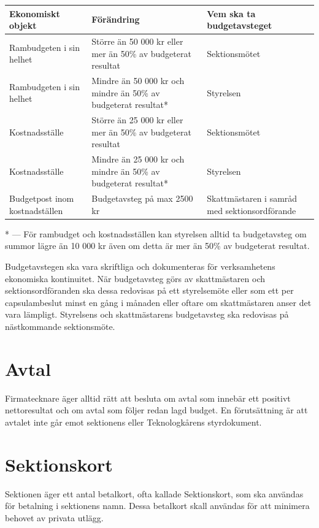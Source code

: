 \documentclass{dsekprotokoll}
\begin{document}
\begin{center}
  \renewcommand{\arraystretch}{1.75}
  \begin{tabular}{p{}|p{}|p{}}
    Ekonomiskt objekt & Förändring & Vem ska ta budgetavsteget \\ \hline
    Rambudgeten i sin helhet & Större än 50 000 kr eller mer än 50\% av
    budgeterat resultat & Sektionsmötet \\
    Rambudgeten i sin helhet & Mindre än 50 000 kr och mindre än 50\% av
    budgeterat resultat* & Styrelsen \\
    Kostnadsställe & Större än 25 000 kr eller mer än 50\% av budgeterat
    resultat & Sektionsmötet \\
    Kostnadsställe & Mindre än 25 000 kr och mindre än 50\% av budgeterat
    resultat* & Styrelsen \\
    Budgetpost inom kostnadställen & Budgetavsteg på max 2500 kr & Skattmästaren
    i samråd med sektionsordförande
  \end{tabular}
  \renewcommand{\arraystretch}{1.0}
\end{center}
* --- För rambudget och kostnadsställen kan styrelsen alltid ta
budgetavsteg om summor lägre
än 10 000 kr även om detta är mer än 50\% av budgeterat resultat.

Budgetavstegen ska vara skriftliga och dokumenteras för verksamhetens ekonomiska
kontinuitet. När budgetavsteg görs av skattmästaren och sektionsordföranden ska
dessa redovisas på ett styrelsemöte eller som ett per capsulambeslut minst en
gång i månaden eller oftare om skattmästaren anser det vara lämpligt.
Styrelsens och skattmästarens budgetavsteg ska redovisas på nästkommande
sektionsmöte.

\section{Avtal}
Firmatecknare äger alltid rätt att besluta om avtal som innebär ett
positivt nettoresultat och om
avtal som följer redan lagd budget. En förutsättning är att avtalet
inte går emot sektionens eller
Teknologkårens styrdokument.

\section{Sektionskort}
Sektionen äger ett antal betalkort, ofta kallade Sektionskort, som
ska användas för betalning i
sektionens namn. Dessa betalkort skall användas för att minimera
behovet av privata utlägg.
\end{document}
